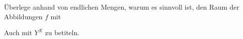 \begin{exercise}
  Überlege anhand von endlichen Mengen, warum es sinnvoll ist, den Raum der
  Abbildungen $f$ mit
  \begin{center}
  \end{center}
  Auch mit $Y^X$ zu betiteln.
\end{exercise}
